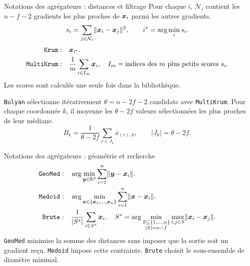 \begin{frame}{Notations des agrégateurs : distances et filtrage}
    \small
    Pour chaque $i$, $\mathcal{N}_i$ contient les $n-f-2$ gradients les plus
    proches de $\boldsymbol{x}_i$ parmi les autres gradients.
    \[
        s_i=\sum_{j\in\mathcal{N}_i}\lVert \boldsymbol{x}_i-\boldsymbol{x}_j \rVert^{2},
        \qquad i^*=\arg\min_i s_i.
    \]
    \begin{align*}
        \texttt{Krum}:\quad & \boldsymbol{x}_{i^*}.
        \\
        \texttt{MultiKrum}:\quad
        & \frac{1}{m}\sum_{i\in I_m}\boldsymbol{x}_i,
          \quad I_m=\text{indices des $m$ plus petits scores }s_i.
    \end{align*}
    Les scores sont calculés une seule fois dans la bibliothèque.

    \medskip
    \texttt{Bulyan} sélectionne itérativement $\theta=n-2f-2$ candidats avec
    \texttt{MultiKrum}. Pour chaque coordonnée $k$, il moyenne les
    $\theta-2f$ valeurs sélectionnées les plus proches de leur médiane.
    \[
        B_k=\frac{1}{\theta-2f}\sum_{r\in J_k}x_{(r),k},
        \qquad |J_k|=\theta-2f.
    \]
\end{frame}

\begin{frame}{Notations des agrégateurs : géométrie et recherche}
    \small
    \begin{align*}
        \texttt{GeoMed}:\quad
        & \arg\min_{\boldsymbol{y}\in\mathbb{R}^d}
          \sum_{i=1}^{n}\lVert \boldsymbol{y}-\boldsymbol{x}_i \rVert.
        \\
        \texttt{Medoid}:\quad
        & \arg\min_{\boldsymbol{x}\in\{\boldsymbol{x}_1,\ldots,\boldsymbol{x}_n\}}
          \sum_{i=1}^{n}\lVert \boldsymbol{x}-\boldsymbol{x}_i \rVert.
        \\
        \texttt{Brute}:\quad
        & \frac{1}{|S^*|}\sum_{i\in S^*}\boldsymbol{x}_i,
          \quad S^*=\arg\min_{\substack{S\subseteq\{1,\ldots,n\}\\|S|=n-f}}
          \max_{i,j\in S}\lVert \boldsymbol{x}_i-\boldsymbol{x}_j \rVert.
    \end{align*}
    \texttt{GeoMed} minimise la somme des distances sans imposer que la sortie
    soit un gradient reçu. \texttt{Medoid} impose cette contrainte.
    \texttt{Brute} choisit le sous-ensemble de diamètre minimal.
\end{frame}

